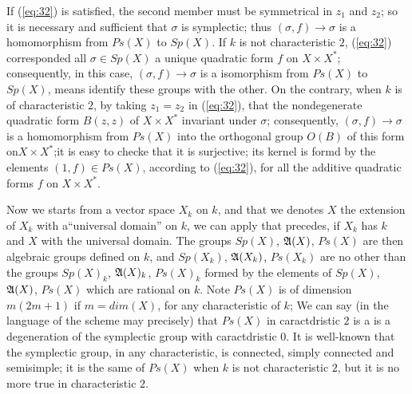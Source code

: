 \documentclass[12pt]{amsart}
\begin{document}
If (\ref{eq:32}) is satisfied, 
the second member must be symmetrical in $z_1$ and $z_2$;
so it is necessary and sufficient that $\sigma$ is symplectic;
thus $(\sigma, f)\to \sigma$ is a homomorphism from $Ps(X)$ to $Sp(X)$.
If $k$ is not characteristic $2$, (\ref{eq:32}) corresponded all $\sigma \in Sp(X)$
a unique quadratic form $f$ on $X\times X^*$; 
consequently, in this case, $(\sigma,f)\to \sigma$ is a
isomorphism from $Ps(X)$ to  $Sp(X)$,
means identify these groups with the other.
On the contrary, when $k$ is of characteristic $2$,
 by taking $z_1 =z_2$ in (\ref{eq:32}), that the nondegenerate quadratic form $B(z,z)$ 
of $X\times X^*$  invariant under $\sigma$;  consequently, $(\sigma,f)\to \sigma$ is a homomorphism from $Ps(X)$
into the orthogonal group $O(B)$ of this form on$X\times X^*$;it is easy to checke that it is 
surjective; its kernel is formd by the elements $(1,f)\in Ps (X)$, according to (\ref{eq:32}),
for all the additive quadratic forms $f$ on $X\times X^*$.

Now we starts from a vector space $X_k$ on $k$, 
and that we denotes $X$ the extension of $X_k$ with a``universal domain'' on $k$,
we can apply that precedes, if $X_k$ has $k$ and
$X$ with the universal domain. The groups $Sp(X)$, ${\mathfrak{A}}(X)$, $Ps(X)$ are then algebraic groups defined on $k$, 
and $Sp(X_k)$, ${\mathfrak{A}}(X_k)$, $Ps(X_k)$ are no other than the groups 
$Sp(X)_k$, ${\mathfrak{A}}(X)_k$, $Ps(X)_k$  formed by the elements of $Sp(X)$, ${\mathfrak{A}}(X)$, 
$Ps(X)$ which are rational on $k$. 
Note $Ps(X)$ is of dimension $m(2m + 1)$ if $m =dim(X)$, for any characteristic of $k$;
We can say (in the language of the scheme may precisely) that $Ps(X)$ in 
caractdristic $2$ is a  is a degeneration of the
 symplectic group with caractdristic $0$. 
It is well-known that the symplectic group, in any characteristic, 
is connected, 
simply connected and semisimple;
it is the same of $Ps(X)$ when $k$ is not characteristic $2$, 
but it is no more true in characteristic $2$.
\end{document}
